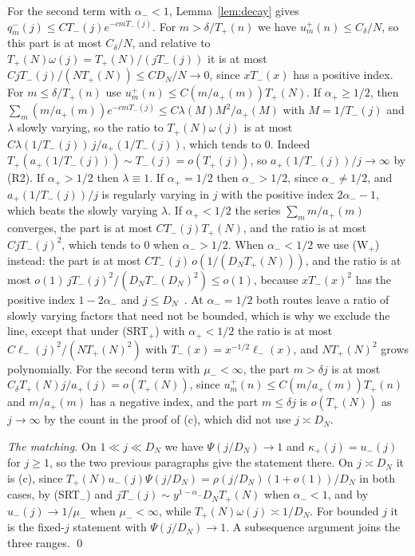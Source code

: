 For the second term with $\alpha_\minus<1$, Lemma~\ref{lem:decay} gives
$q^\minus_m(j)\le CT_\minus(j)e^{-cmT_\minus(j)}$. For $m>\delta/T_\plus(n)$ we have $u^\plus_m(n)\le C_\delta/N$,
so this part is at most $C_\delta/N$, and relative to $T_\plus(N)\omega(j)=T_\plus(N)/(jT_\minus(j))$ it
is at most $CjT_\minus(j)/(NT_\plus(N))\le CD_N/N\to0$, since $xT_\minus(x)$ has a positive index. For
$m\le\delta/T_\plus(n)$ use $u^\plus_m(n)\le C(m/a_\plus(m))T_\plus(N)$. If $\alpha_\plus\ge1/2$, then
$\sum_m(m/a_\plus(m))e^{-cmT_\minus(j)}\le C\lambda(M)M^2/a_\plus(M)$ with $M=1/T_\minus(j)$ and $\lambda$
slowly varying, so the ratio to $T_\plus(N)\omega(j)$ is at most
$C\lambda(1/T_\minus(j))\,j/a_\plus(1/T_\minus(j))$, which tends to $0$. Indeed
$T_\plus(a_\plus(1/T_\minus(j)))\sim T_\minus(j)=o(T_\plus(j))$, so $a_\plus(1/T_\minus(j))/j\to\infty$ by (R2). If
$\alpha_\plus>1/2$ then $\lambda\equiv1$. If $\alpha_\plus=1/2$ then $\alpha_\minus>1/2$, since
$\alpha_\minus\ne1/2$, and $a_\plus(1/T_\minus(j))/j$ is regularly varying in $j$ with the positive index
$2\alpha_\minus-1$, which beats the slowly varying $\lambda$. If $\alpha_\plus<1/2$ the series
$\sum_mm/a_\plus(m)$ converges, the part is at most $CT_\minus(j)T_\plus(N)$, and the ratio is at most
$CjT_\minus(j)^2$, which tends to $0$ when $\alpha_\minus>1/2$. When $\alpha_\minus<1/2$ we use (W$_\plus$)
instead: the part is at most $CT_\minus(j)\,o(1/(D_NT_\plus(N)))$, and the ratio is at most
$o(1)\,jT_\minus(j)^2/(D_NT_\minus(D_N)^2)\le o(1)$, because $xT_\minus(x)^2$ has the positive index
$1-2\alpha_\minus$ and $j\le D_N$~\cite[Theorem~1.5.3]{bgt1989}. At $\alpha_\minus=1/2$ both routes
leave a ratio of slowly varying factors that need not be bounded, which is why we exclude the
line, except that under (SRT$_\plus$) with $\alpha_\plus<1/2$ the ratio is at most
$C\ell_\minus(j)^2/(NT_\plus(N)^2)$ with $T_\minus(x)=x^{-1/2}\ell_\minus(x)$, and $NT_\plus(N)^2$ grows
polynomially. For the second term with $\mu_\minus<\infty$, the part $m>\delta j$ is at most
$C_\delta T_\plus(N)j/a_\plus(j)=o(T_\plus(N))$, since $u^\plus_m(n)\le C(m/a_\plus(m))T_\plus(n)$ and
$m/a_\plus(m)$ has a negative index, and the part $m\le\delta j$ is $o(T_\plus(N))$ as $j\to\infty$ by
the count in the proof of (c), which did not use $j\asymp D_N$.

\emph{The matching.} On $1\ll j\ll D_N$ we have $\Psi(j/D_N)\to1$ and $\kappa_\plus(j)=u_\minus(j)$ for
$j\ge1$, so the two previous paragraphs give the statement there. On $j\asymp D_N$ it is (c),
since $T_\plus(N)u_\minus(j)\Psi(j/D_N)=\rho(j/D_N)(1+o(1))/D_N$ in both cases, by (SRT$_\minus$)
and $jT_\minus(j)\sim y^{1-\alpha_\minus}D_NT_\plus(N)$ when $\alpha_\minus<1$, and by
$u_\minus(j)\to1/\mu_\minus$ when $\mu_\minus<\infty$, while $T_\plus(N)\omega(j)\asymp1/D_N$. For bounded
$j$ it is the fixed-$j$ statement with $\Psi(j/D_N)\to1$. A subsequence argument joins the
three ranges. \qed

